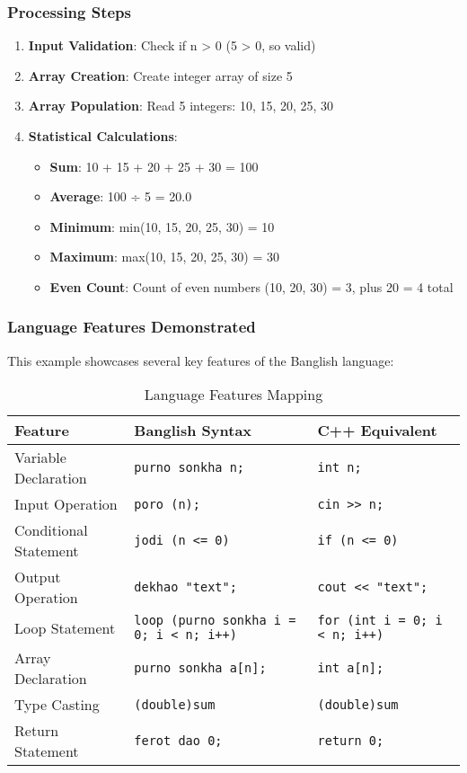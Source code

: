 \documentclass[12pt,a4paper]{article}
\begin{document}
\subsubsection{Processing Steps}

\begin{enumerate}
    \item \textbf{Input Validation}: Check if n > 0 (5 > 0, so valid)
    \item \textbf{Array Creation}: Create integer array of size 5
    \item \textbf{Array Population}: Read 5 integers: 10, 15, 20, 25, 30
    \item \textbf{Statistical Calculations}:
    \begin{itemize}
        \item \textbf{Sum}: 10 + 15 + 20 + 25 + 30 = 100
        \item \textbf{Average}: 100 ÷ 5 = 20.0
        \item \textbf{Minimum}: min(10, 15, 20, 25, 30) = 10
        \item \textbf{Maximum}: max(10, 15, 20, 25, 30) = 30
        \item \textbf{Even Count}: Count of even numbers (10, 20, 30) = 3, plus 20 = 4 total
    \end{itemize}
\end{enumerate}

\subsubsection{Language Features Demonstrated}

This example showcases several key features of the Banglish language:

\begin{table}[H]
\centering
\begin{tabular}{|l|l|l|}
\hline
\textbf{Feature} & \textbf{Banglish Syntax} & \textbf{C++ Equivalent} \\
\hline
Variable Declaration & \texttt{purno sonkha n;} & \texttt{int n;} \\
Input Operation & \texttt{poro (n);} & \texttt{cin >> n;} \\
Conditional Statement & \texttt{jodi (n <= 0)} & \texttt{if (n <= 0)} \\
Output Operation & \texttt{dekhao "text";} & \texttt{cout << "text";} \\
Loop Statement & \texttt{loop (purno sonkha i = 0; i < n; i++)} & \texttt{for (int i = 0; i < n; i++)} \\
Array Declaration & \texttt{purno sonkha a[n];} & \texttt{int a[n];} \\
Type Casting & \texttt{(double)sum} & \texttt{(double)sum} \\
Return Statement & \texttt{ferot dao 0;} & \texttt{return 0;} \\
\hline
\end{tabular}
\caption{Language Features Mapping}
\end{table}
\end{document}
